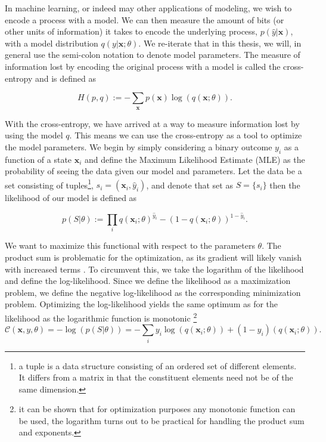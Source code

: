 In machine learning, or indeed may other applications of modeling, we wish to encode a process with a model. We can then measure the amount of bits (or other units of information) it takes to encode the underlying process, $p(\hat{y} | \boldsymbol{x})$, with a model distribution $q(y| \boldsymbol{x}; \theta)$. We re-iterate that in this thesis, we will, in general use the semi-colon notation to denote model parameters. The measure of information lost by encoding the original process with a model is called the cross-entropy and is defined as

\begin{equation}
H(p, q) := - \sum_{\boldsymbol{x}} p(\boldsymbol{x})\log(q(\boldsymbol{x}; \theta)).
\end{equation}

\noindent With the cross-entropy, we have arrived at a way to measure information lost by using the model $q$. This means we can use the cross-entropy as a tool to optimize the model parameters. We begin by simply considering a binary outcome $y_i$ as a function of a state $\boldsymbol{x}_i$ and define the Maximum Likelihood Estimate (MLE) as the probability of seeing the data given our model and parameters. Let the data be a set consisting of tuples\footnote{a tuple is a data structure consisting of an ordered set of different elements. It differs from a matrix in that the constituent elements need not be of the same dimension.}, $s_i = (\boldsymbol{x}_i, \hat{y}_i)$, and denote that set as $S = \{s_i\}$ then the likelihood of our model is defined as 

\begin{equation}\label{eq:likelihood}
p(S | \theta) := \prod_i q(\boldsymbol{x}_i; \theta)^{\hat{y}_i} - (1-q(\boldsymbol{x}_i; \theta))^{1-\hat{y}_i}.
\end{equation}

\noindent We want to maximize this functional with respect to the parameters $\theta$. The product sum is problematic for the optimization, as its gradient will likely vanish with increased terms . To circumvent this, we take the logarithm of the likelihood and define the log-likelihood. Since we define the likelihood as a maximization problem, we define the negative log-likelihood as the corresponding minimization problem. Optimizing the log-likelihood yields the same optimum as for the likelihood as the logarithmic function is monotonic \footnote{it can be shown that for optimization purposes any monotonic function can be used, the logarithm turns out to be practical for handling the product sum and exponents.}
\begin{equation}\label{eq:mle}
\mathcal{C}(\boldsymbol{x}, y, \theta) = -\log(p(S | \theta)) = -\sum_i y_i\log(q(\boldsymbol{x}_i; \theta)) + (1-y_i)(q(\boldsymbol{x}_i; \theta)).
\end{equation}

